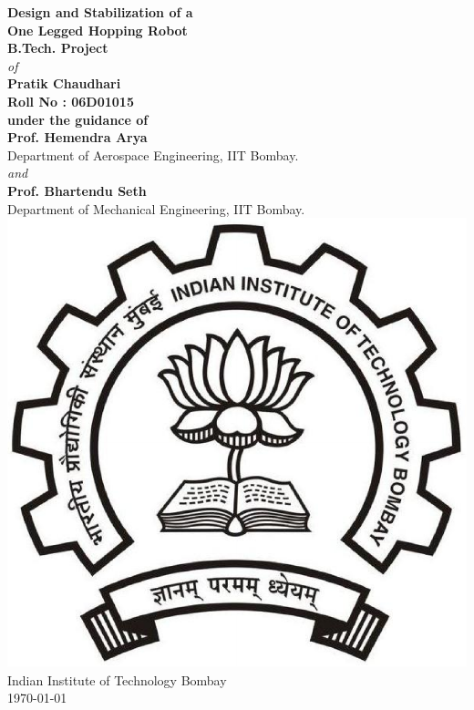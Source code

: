 \begin{titlepage}
\label{pg:title}
\begin{center}
\vspace*{0.5in}
{\bf \Huge Design and Stabilization of a}\\[0.25in]
{\bf \Huge One Legged Hopping Robot}\\[0.5in]
{\bf \Large B.Tech. Project}\\[0.25in]
{\normalsize \it of}\\[0.25in]
{\bf \Large Pratik Chaudhari}\\[0.2in]
{\bf \Large Roll No : 06D01015}\\[0.8in]
{\bf \Large under the guidance of}\\[0.2in]
{{\bf \Large 	Prof. Hemendra Arya}\\
{\normalsize	 Department of Aerospace Engineering, IIT Bombay.}}\\[0.25in]
{\normalsize \it and}\\[0.25in]
{{\bf \Large Prof. Bhartendu Seth}\\
{\normalsize	 Department of Mechanical Engineering, IIT Bombay.}}\\[1in]
\includegraphics[scale=0.2]{fig/iitblogo.pdf} \\
Indian Institute of Technology Bombay\\
\today
\end{center}
\end{titlepage}

